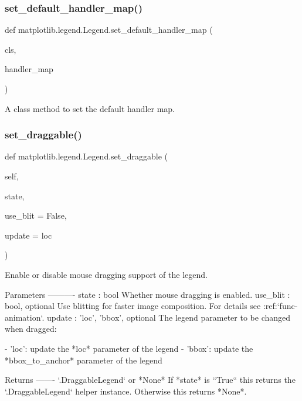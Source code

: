 \subsubsection{\texorpdfstring{set\+\_\+default\+\_\+handler\+\_\+map()}{set\_default\_handler\_map()}}
{\footnotesize\ttfamily def matplotlib.\+legend.\+Legend.\+set\+\_\+default\+\_\+handler\+\_\+map (\begin{DoxyParamCaption}\item[{}]{cls,  }\item[{}]{handler\+\_\+map }\end{DoxyParamCaption})}

\begin{DoxyVerb}A class method to set the default handler map.
\end{DoxyVerb}
 \mbox{\label{classmatplotlib_1_1legend_1_1Legend_af2fbe7faeea45224cebb6bc40198bcf5}} 
\subsubsection{\texorpdfstring{set\+\_\+draggable()}{set\_draggable()}}
{\footnotesize\ttfamily def matplotlib.\+legend.\+Legend.\+set\+\_\+draggable (\begin{DoxyParamCaption}\item[{}]{self,  }\item[{}]{state,  }\item[{}]{use\+\_\+blit = {\ttfamily False},  }\item[{}]{update = {\ttfamily \textquotesingle{}loc\textquotesingle{}} }\end{DoxyParamCaption})}

\begin{DoxyVerb}Enable or disable mouse dragging support of the legend.

Parameters
----------
state : bool
    Whether mouse dragging is enabled.
use_blit : bool, optional
    Use blitting for faster image composition. For details see
    :ref:`func-animation`.
update : {'loc', 'bbox'}, optional
    The legend parameter to be changed when dragged:

    - 'loc': update the *loc* parameter of the legend
    - 'bbox': update the *bbox_to_anchor* parameter of the legend

Returns
-------
`.DraggableLegend` or *None*
    If *state* is ``True`` this returns the `.DraggableLegend` helper
    instance. Otherwise this returns *None*.
\end{DoxyVerb}
 \mbox{\label{classmatplotlib_1_1legend_1_1Legend_a5cec6b9dea722d9167b810f347ee0242}} 
